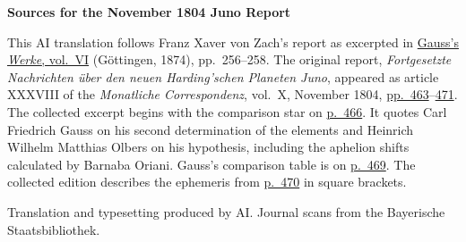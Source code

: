 \clearpage\thispagestyle{empty}
\begin{center}\textbf{Sources for the November 1804 Juno Report}\end{center}
\noindent This AI translation follows Franz Xaver von Zach’s report as excerpted in \href{https://gdz.sub.uni-goettingen.de/id/PPN236007467}{Gauss’s \textit{Werke}, vol.~VI} (Göttingen, 1874), pp.~256--258. The original report, \textit{Fortgesetzte Nachrichten über den neuen Harding’schen Planeten Juno}, appeared as article XXXVIII of the \textit{Monatliche Correspondenz}, vol.~X, November 1804, \href{https://www.digitale-sammlungen.de/en/view/bsb10538602?page=477}{pp.~463}--\href{https://www.digitale-sammlungen.de/en/view/bsb10538602?page=485}{471}. The collected excerpt begins with the comparison star on \href{https://www.digitale-sammlungen.de/en/view/bsb10538602?page=480}{p.~466}. It quotes Carl Friedrich Gauss on his second determination of the elements and Heinrich Wilhelm Matthias Olbers on his hypothesis, including the aphelion shifts calculated by Barnaba Oriani. Gauss’s comparison table is on \href{https://www.digitale-sammlungen.de/en/view/bsb10538602?page=483}{p.~469}. The collected edition describes the ephemeris from \href{https://www.digitale-sammlungen.de/en/view/bsb10538602?page=484}{p.~470} in square brackets.
\par\smallskip\noindent Translation and typesetting produced by AI. Journal scans from the Bayerische Staatsbibliothek.
\clearpage
